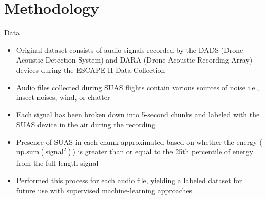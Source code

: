 \documentclass{if-beamer}
\begin{document}

\section{Methodology}

\begin{frame}{Data}

    \begin{itemize}
        \item Original dataset consists of audio signals recorded by the DADS (Drone Acoustic Detection System) and DARA (Drone Acoustic Recording Array) devices during the ESCAPE II Data Collection
        \item Audio files collected during SUAS flights contain various sources of noise i.e., insect noises, wind, or chatter 
        \item Each signal has been broken down into 5-second chunks and labeled with the SUAS device in the air during the recording
        \item Presence of SUAS in each chunk approximated based on whether the energy (\(\text{np.sum}(\text{signal}^2)\)) is greater than or equal to the 25th percentile of energy from the full-length signal
        \item Performed this process for each audio file, yielding a labeled dataset for future use with supervised machine-learning approaches


    \end{itemize}

\end{frame}
\end{document}
